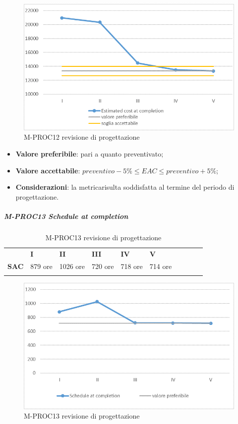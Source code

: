 \begin{figure}[H] 	
	\includegraphics[width=\linewidth]{./img/grafici/RP9.png}	
	\caption{M-PROC12 revisione di progettazione\glo}	
\end{figure}
\begin{itemize}
	\item \textbf{Valore preferibile}: pari a quanto preventivato;
	\item \textbf{Valore accettabile}: $preventivo-5\% \le EAC \le preventivo+5\%$;
	\item \textbf{Considerazioni}: la metrica\glosp risulta soddisfatta al termine del periodo di progettazione\glo.
\end{itemize}
\subparagraph{M-PROC13 Schedule at completion} \mbox{}
\begin{longtable}[H!] {						
		>{}p{18mm}  		
		>{}p{16mm}
		>{}p{16mm}		
		>{}p{16mm}		
		>{}p{16mm}		
		>{}p{16mm}		
		>{}p{16mm}
		>{}p{16mm}
		>{}p{16mm}
		>{}p{16mm}
	}
	\rowcolor{gray!50}
	\textbf{} & \textbf{I} & \textbf{II} & \textbf{III} & \textbf{IV} & \textbf{V} \TBstrut \\ [2mm]
	\textbf{SAC} & 879 ore & 1026 ore & 720 ore & 718 ore & 714 ore \TBstrut \\ [2mm]
	\rowcolor{white}
	\caption{M-PROC13 revisione di progettazione\glo}
\end{longtable}
\begin{figure}[H] 	
	\includegraphics[width=\linewidth]{./img/grafici/RP10.png}	
	\caption{M-PROC13 revisione di progettazione\glo}	
\end{figure}
